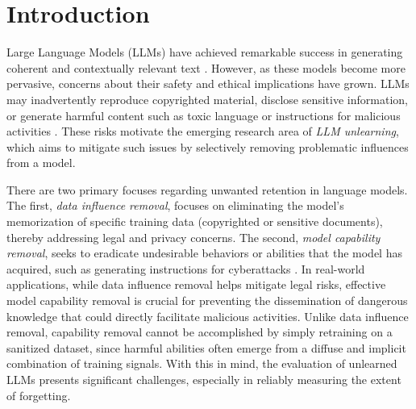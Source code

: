 
\section{Introduction}

Large Language Models (LLMs) have achieved remarkable success in generating coherent and contextually relevant text \citep{achiam2023gpt,dubey2024Llama}. However, as these models become more pervasive, concerns about their safety and ethical implications have grown. LLMs may inadvertently reproduce copyrighted material, disclose sensitive information, or generate harmful content such as toxic language or instructions for malicious activities \citep{eldan2023s,wei2024evaluating,huang2024trustllm,li2024wmdp,liu2024machine,li2024salad}. These risks motivate the emerging research area of \emph{LLM unlearning}, which aims to mitigate such issues by selectively removing problematic influences from a model.





There are two primary focuses regarding unwanted retention in language models.
The first, \emph{data influence removal}, focuses on eliminating the model’s memorization of specific training data (\eg copyrighted or sensitive documents), thereby addressing legal and privacy concerns. The second, \emph{model capability removal}, seeks to eradicate undesirable behaviors or abilities that the model has acquired, such as generating instructions for cyberattacks \citep{li2024wmdp,zhang2024safe}.  In real-world applications, while data influence removal helps mitigate legal risks, effective model capability removal is crucial for preventing the dissemination of dangerous knowledge that could directly facilitate malicious activities. Unlike data influence removal, capability removal cannot be accomplished by simply retraining on a sanitized dataset, since harmful abilities often emerge from a diffuse and implicit combination of training signals. With this in mind, the evaluation of unlearned LLMs presents significant challenges, especially in reliably measuring the extent of forgetting.

